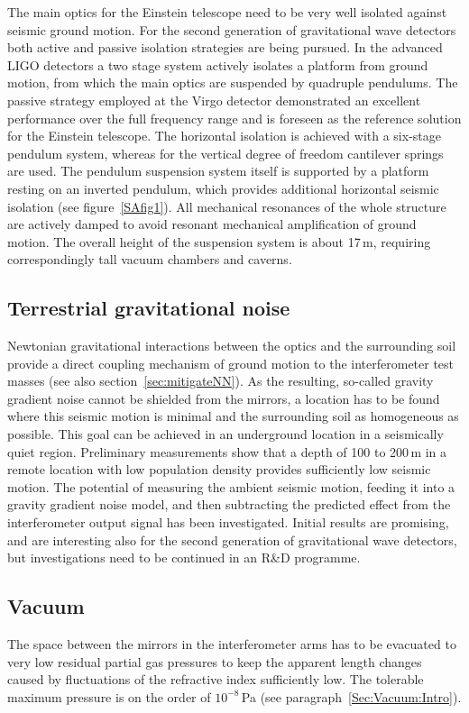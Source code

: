 The main optics for the Einstein telescope need to be very well isolated against 
seismic ground motion. For the second generation of gravitational wave detectors 
both active and passive isolation strategies are being pursued. In the advanced 
LIGO detectors a two stage system actively isolates a platform from ground 
motion, from which the main optics are suspended by quadruple pendulums. The 
passive strategy employed at the Virgo detector demonstrated an excellent 
performance over the full frequency range and is foreseen 
as the reference solution for the Einstein telescope. The horizontal isolation is 
achieved with a six-stage pendulum system, whereas for the vertical degree of 
freedom cantilever springs  are used. The pendulum suspension system itself is 
supported by a platform resting on an inverted pendulum, which provides 
additional horizontal seismic isolation (see figure~\ref{SAfig1}). All mechanical 
resonances of the whole structure are actively damped to avoid resonant 
mechanical amplification of ground motion. The overall height of the suspension 
system is about 17\,m, requiring correspondingly tall vacuum chambers and caverns.

\subsection{Terrestrial gravitational noise}
Newtonian gravitational interactions between the optics and the surrounding soil 
provide a direct coupling mechanism of ground motion to the interferometer test 
masses (see also section~\ref{sec:mitigateNN}). As the resulting, so-called 
gravity gradient noise cannot be shielded from the mirrors, a location has to be 
found where this seismic motion is minimal and the surrounding soil as 
homogeneous as possible. This goal can be achieved in an underground location 
in a seismically quiet region. Preliminary measurements show that a depth of 100 to 
200\,m in a remote location with low population density provides sufficiently low 
seismic motion. The potential of measuring the ambient seismic motion, feeding 
it into a gravity gradient noise model, and then subtracting the predicted effect 
from the interferometer output signal has been investigated. Initial results are 
promising, and are interesting also for the second generation of gravitational 
wave detectors, but investigations need to be continued in an R\&D programme. 

\subsection{Vacuum}
The space between the mirrors in the interferometer arms has to be evacuated 
to very low residual partial gas pressures to keep the apparent length changes 
caused by fluctuations of the refractive index sufficiently low. The tolerable 
maximum pressure is on the order of $10^{-8}$\,Pa (see paragraph~\ref{Sec:Vacuum:Intro}).
 
